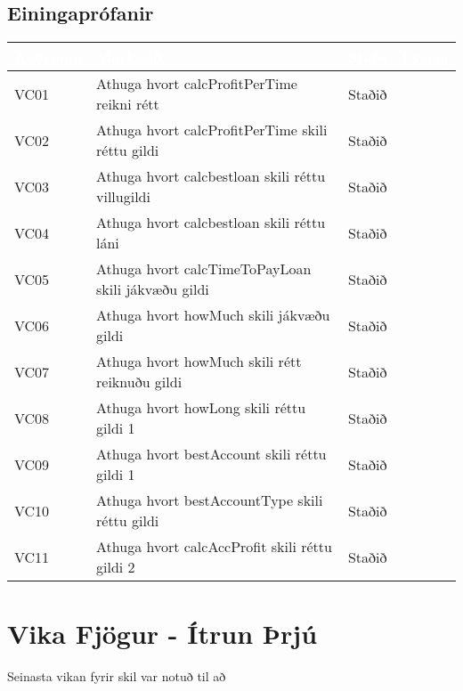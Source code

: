 \documentclass[a4paper,10pt]{article}
\begin{document}
\subsection{Einingaprófanir}
\begin{center}
    \begin{tabular}{| l | p{6cm} | l | l |}
    \hline
    \rowcolor{LightBlue!65}
     \textcolor{White}{Auðkenni} & \textcolor{White}{Markmið} & \textcolor{White}{Staða} & \textcolor{White}{Lýsing} \\ 
     \hline
     \hline
    \rowcolor{LightCol!30}
    VC01 & Athuga hvort calcProfitPerTime  reikni rétt & Staðið & \\ \hline
    VC02 & Athuga hvort calcProfitPerTime  skili réttu gildi & Staðið & \\ \hline
    \rowcolor{LightCol!30}
    VC03 & Athuga hvort calcbestloan  skili réttu villugildi & Staðið & \\ \hline
    VC04 & Athuga hvort calcbestloan  skili réttu láni & Staðið & \\ \hline
    \rowcolor{LightCol!30}
    VC05 & Athuga hvort calcTimeToPayLoan  skili jákvæðu gildi & Staðið & \\ \hline
    VC06 & Athuga hvort howMuch  skili jákvæðu gildi & Staðið & \\ \hline
    \rowcolor{LightCol!30}
    VC07 & Athuga hvort howMuch  skili rétt reiknuðu gildi & Staðið & \\ \hline
    VC08 & Athuga hvort howLong  skili réttu gildi 1& Staðið & \\ \hline
    \rowcolor{LightCol!30}
    VC09 & Athuga hvort bestAccount  skili réttu gildi 1 & Staðið & \\ \hline
    VC10 & Athuga hvort bestAccountType  skili réttu gildi & Staðið & \\ \hline
    \rowcolor{LightCol!30}
    VC11 & Athuga hvort calcAccProfit  skili réttu gildi 2& Staðið & \\ \hline
   
    \end{tabular}
\end{center}


\section{Vika Fjögur - Ítrun Þrjú}
Seinasta vikan fyrir skil var notuð til að 
\end{document}
